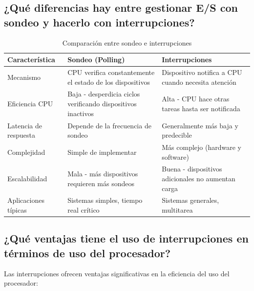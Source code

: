 \documentclass[12pt]{article}
\begin{document}
	\subsection{¿Qué diferencias hay entre gestionar E/S con sondeo y hacerlo con interrupciones?}
	
	\begin{table}[h]
		\centering
		\begin{tabular}{|p{4cm}|p{5cm}|p{5cm}|}
			\hline
			\textbf{Característica} & \textbf{Sondeo (Polling)} & \textbf{Interrupciones} \\
			\hline
			Mecanismo & CPU verifica constantemente el estado de los dispositivos & Dispositivo notifica a CPU cuando necesita atención \\
			\hline
			Eficiencia CPU & Baja - desperdicia ciclos verificando dispositivos inactivos & Alta - CPU hace otras tareas hasta ser notificada \\
			\hline
			Latencia de respuesta & Depende de la frecuencia de sondeo & Generalmente más baja y predecible \\
			\hline
			Complejidad & Simple de implementar & Más complejo (hardware y software) \\
			\hline
			Escalabilidad & Mala - más dispositivos requieren más sondeos & Buena - dispositivos adicionales no aumentan carga \\
			\hline
			Aplicaciones típicas & Sistemas simples, tiempo real crítico & Sistemas generales, multitarea \\
			\hline
		\end{tabular}
		\caption{Comparación entre sondeo e interrupciones}
	\end{table}
	
	\subsection{¿Qué ventajas tiene el uso de interrupciones en términos de uso del procesador?}
	
	Las interrupciones ofrecen ventajas significativas en la eficiencia del uso del procesador:
	
\end{document}
